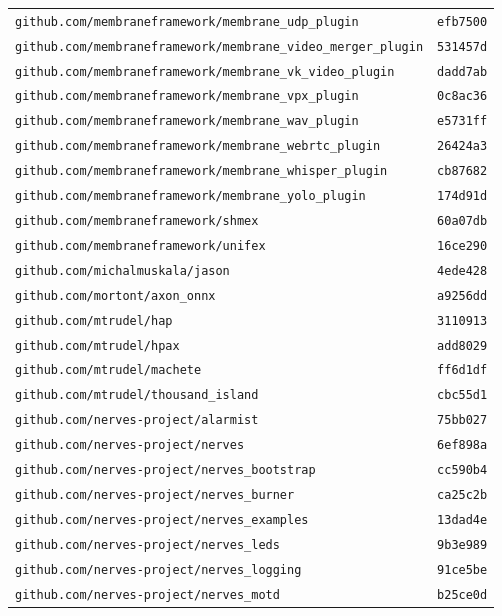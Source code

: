 \begin{longtable}{@{}p{} l@{}}
\texttt{github.com/membraneframework/membrane\_udp\_plugin} & \texttt{efb7500} \\
\texttt{github.com/membraneframework/membrane\_video\_merger\_plugin} & \texttt{531457d} \\
\texttt{github.com/membraneframework/membrane\_vk\_video\_plugin} & \texttt{dadd7ab} \\
\texttt{github.com/membraneframework/membrane\_vpx\_plugin} & \texttt{0c8ac36} \\
\texttt{github.com/membraneframework/membrane\_wav\_plugin} & \texttt{e5731ff} \\
\texttt{github.com/membraneframework/membrane\_webrtc\_plugin} & \texttt{26424a3} \\
\texttt{github.com/membraneframework/membrane\_whisper\_plugin} & \texttt{cb87682} \\
\texttt{github.com/membraneframework/membrane\_yolo\_plugin} & \texttt{174d91d} \\
\texttt{github.com/membraneframework/shmex} & \texttt{60a07db} \\
\texttt{github.com/membraneframework/unifex} & \texttt{16ce290} \\
\texttt{github.com/michalmuskala/jason} & \texttt{4ede428} \\
\texttt{github.com/mortont/axon\_onnx} & \texttt{a9256dd} \\
\texttt{github.com/mtrudel/hap} & \texttt{3110913} \\
\texttt{github.com/mtrudel/hpax} & \texttt{add8029} \\
\texttt{github.com/mtrudel/machete} & \texttt{ff6d1df} \\
\texttt{github.com/mtrudel/thousand\_island} & \texttt{cbc55d1} \\
\texttt{github.com/nerves-project/alarmist} & \texttt{75bb027} \\
\texttt{github.com/nerves-project/nerves} & \texttt{6ef898a} \\
\texttt{github.com/nerves-project/nerves\_bootstrap} & \texttt{cc590b4} \\
\texttt{github.com/nerves-project/nerves\_burner} & \texttt{ca25c2b} \\
\texttt{github.com/nerves-project/nerves\_examples} & \texttt{13dad4e} \\
\texttt{github.com/nerves-project/nerves\_leds} & \texttt{9b3e989} \\
\texttt{github.com/nerves-project/nerves\_logging} & \texttt{91ce5be} \\
\texttt{github.com/nerves-project/nerves\_motd} & \texttt{b25ce0d} \\

\end{longtable}
